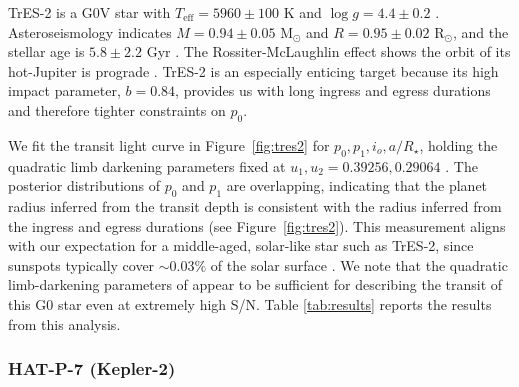 TrES-2 is a G0V star with $T_\mathrm{eff} =5960 \pm 100$ K and $\log g = 4.4 \pm 0.2$  \citep{ODonovan2006, Sozzetti2007}. Asteroseismology indicates $M = 0.94 \pm 0.05$ M$_\odot$ and $R = 0.95 \pm 0.02$ R$_\odot$, and the stellar age is $5.8 \pm 2.2$ Gyr \citep{Barclay2012}. The Rossiter-McLaughlin effect shows the orbit of its hot-Jupiter is prograde \citep{Winn2008}. TrES-2 is an especially enticing target because its high impact parameter, $b=0.84$, provides us with long ingress and egress durations and therefore tighter constraints on $p_0$. 

We fit the transit light curve in Figure~\ref{fig:tres2} for $p_0, p_1, i_o, a/R_\star$, holding the quadratic limb darkening parameters fixed at $u_1,u_2 =0.39256, 0.29064$ \citep{Magic2015}. The posterior distributions of $p_0$ and $p_1$ are overlapping, indicating that the planet radius inferred from the transit depth is consistent with the radius inferred from the ingress and egress durations (see Figure~\ref{fig:tres2}). This measurement aligns with our expectation for a middle-aged, solar-like star such as TrES-2, since sunspots typically cover $\sim 0.03\%$ of the solar surface \citep{Howard1984}. We note that the quadratic limb-darkening parameters of \citep{Magic2015} appear to be sufficient for describing the transit of this G0 star even at extremely high S/N.   Table \ref{tab:results}
reports the results from this analysis.

\subsubsection{HAT-P-7 (Kepler-2)}


